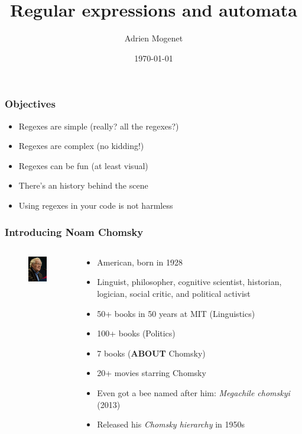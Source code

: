 \documentclass[aspectratio=169,xcolor=table]{beamer}
\title[Regexes and automata]{Regular expressions and automata}
\author{Adrien Mogenet}
\institute[CS]{ContentSquare
  \medskip
  \textit{am@csq.io}
}
\date{\today}
\begin{document}
\begin{frame}
  \titlepage
\end{frame}


\begin{frame}
  \frametitle{Objectives}
  \begin{itemize}
    \item Regexes are simple (really? all the regexes?) \pause
    \item Regexes are complex (no kidding!) \pause
    \item Regexes can be fun (at least visual) \pause
    \item There's an history behind the scene \pause
    \item Using regexes in your code is not harmless
  \end{itemize}
\end{frame}


\begin{frame}
  \frametitle{Introducing Noam Chomsky}
  \begin{columns}[T]
    \begin{column}{.3\textwidth}
        \begin{figure}[h]
        \includegraphics[width=100px]{images/chomsky.jpg}
        \end{figure}
    \end{column}
    \begin{column}{.7\textwidth}
      \begin{itemize}
      \item American, born in 1928 \pause
      \item Linguist, philosopher, cognitive scientist, historian,
        logician, social critic, and political activist \pause
      \item 50+ books in 50 years at MIT (Linguistics) \pause
      \item 100+ books (Politics) \pause
      \item 7 books (\textbf{ABOUT} Chomsky) \pause
      \item 20+ movies starring Chomsky \pause
      \item Even got a bee named after him: \textit{Megachile
          chomskyi} (2013) \pause
      \item Released his \textit{Chomsky hierarchy} in 1950s \pause
      \end{itemize}
    \end{column}
  \end{columns}
\end{frame}
\end{document}
